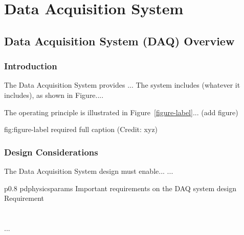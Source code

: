 \chapter{Data Acquisition System}
\label{ch:fdsp-daq}

\section{Data Acquisition System (DAQ) Overview}
\label{sec:fdsp-daq-ov}


\subsection{Introduction}
\label{sec:fdsp-daq-intro}

The Data Acquisition System provides ...
The system includes (whatever it includes), as shown in Figure.... 


The operating principle is illustrated in Figure~\ref{figure-label}... (add figure)

\begin{dunefigure}{fig:figure-label}
{required full caption (Credit: xyz)}
\end{dunefigure}

\subsection{Design Considerations}
\label{sec:fdsp-daq-des-consid}


The Data Acquisition System design must enable... 
...


\begin{dunetable}
{p{0.8\textwidth}}
{pdphysicsparams}
{Important requirements on the DAQ system design}   
Requirement  \\ \toprowrule
  \\ \colhline
   \\ \colhline
 ...\\ 
\end{dunetable}

